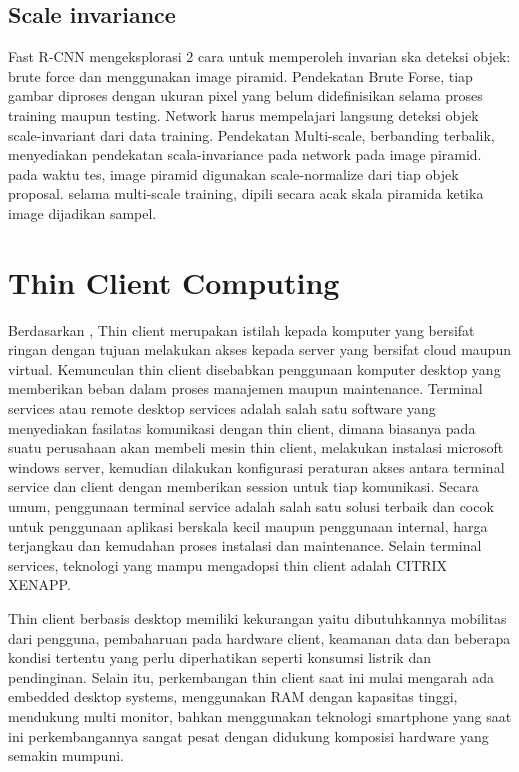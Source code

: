 \subsection{Scale invariance}
Fast R-CNN mengeksplorasi 2 cara untuk memperoleh invarian ska deteksi objek: brute force dan menggunakan image piramid. Pendekatan Brute Forse, tiap gambar diproses dengan ukuran pixel yang belum didefinisikan selama proses training maupun testing. Network harus mempelajari langsung deteksi objek scale-invariant  dari data training. Pendekatan Multi-scale, berbanding terbalik, menyediakan pendekatan scala-invariance pada network pada image piramid. pada waktu tes, image piramid digunakan scale-normalize dari tiap objek proposal. selama multi-scale training, dipili secara acak skala piramida ketika image dijadikan sampel.

\section{Thin Client Computing}
Berdasarkan \cite{thin_client_computing}, Thin client merupakan istilah kepada komputer yang bersifat ringan dengan tujuan melakukan akses kepada server yang bersifat cloud maupun virtual. Kemunculan thin client disebabkan penggunaan komputer desktop yang memberikan beban dalam proses manajemen maupun maintenance.  Terminal services atau remote desktop services adalah salah satu software yang menyediakan fasilatas komunikasi dengan thin client, dimana biasanya pada suatu perusahaan akan membeli mesin thin client, melakukan instalasi microsoft windows server, kemudian dilakukan konfigurasi peraturan akses antara terminal service dan client dengan memberikan session untuk tiap komunikasi. Secara umum, penggunaan terminal service adalah salah satu solusi terbaik dan cocok untuk penggunaan aplikasi berskala kecil maupun penggunaan internal, harga terjangkau dan kemudahan proses instalasi dan maintenance. Selain terminal services, teknologi yang mampu mengadopsi thin client adalah CITRIX XENAPP.

Thin client berbasis desktop memiliki kekurangan yaitu dibutuhkannya mobilitas dari pengguna, pembaharuan pada hardware client, keamanan data dan beberapa kondisi tertentu yang perlu diperhatikan seperti konsumsi listrik dan pendinginan. Selain itu, perkembangan thin client saat ini mulai mengarah ada embedded desktop systems, menggunakan RAM dengan kapasitas tinggi, mendukung multi monitor, bahkan menggunakan teknologi smartphone yang saat ini perkembangannya sangat pesat dengan didukung komposisi hardware yang semakin mumpuni.

